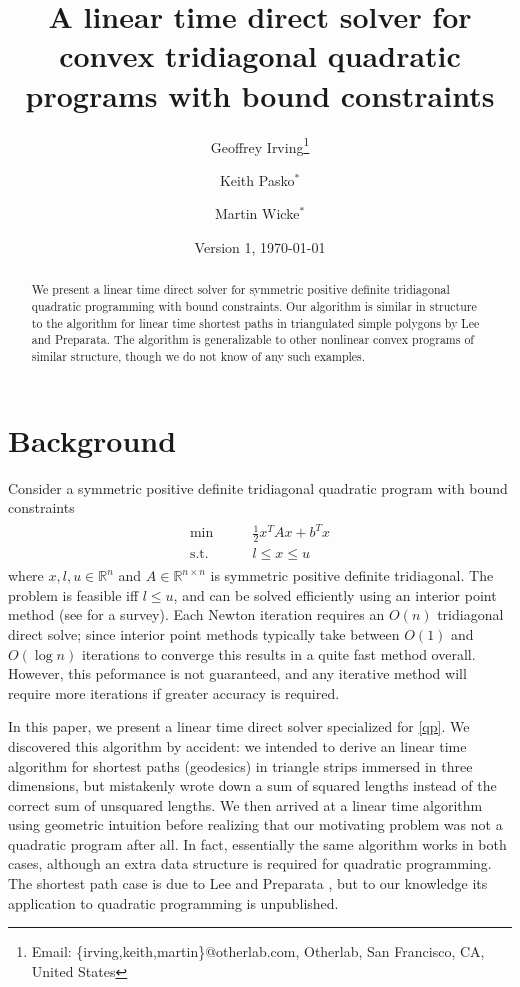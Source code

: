 \documentclass[11pt]{article}
\title{A linear time direct solver for convex tridiagonal quadratic programs with bound constraints}
\author{Geoffrey Irving\thanks{Email: \{irving,keith,martin\}@otherlab.com, Otherlab, San Francisco, CA, United States}
\and Keith Pasko$^*$
\and Martin Wicke$^*$}
\date{Version 1, \today}
\newcommand{\R}{\mathbb{R}}
\begin{document}
\maketitle

\begin{abstract}
We present a linear time direct solver for symmetric positive definite tridiagonal quadratic programming with bound constraints.  Our algorithm is similar in structure to the
algorithm for linear time shortest paths in triangulated simple polygons by Lee and Preparata.  The algorithm is generalizable to other nonlinear convex programs of similar
structure, though we do not know of any such examples.
\end{abstract}

\section{Background}

Consider a symmetric positive definite tridiagonal quadratic program with bound constraints
\begin{align} \label{qp}
\begin{array}{cc}
\min          \qquad& \frac{1}{2} x^T A x + b^T x \\
\textrm{s.t.} & l \le x \le u
\end{array}
\end{align}
where $x,l,u \in \R^n$ and $A \in \R^{n \times n}$ is symmetric positive definite tridiagonal.  The problem is feasible iff $l \le u$, and can be solved efficiently using an interior point method (see \cite{gondzio2012interior}
for a survey).  Each Newton iteration requires an $O(n)$ tridiagonal direct solve; since interior point methods typically take between $O(1)$ and $O(\log n)$ iterations to converge \cite{colombo2008further}
this results in a quite fast method overall.  However, this peformance is not guaranteed, and any iterative method will require more iterations if greater accuracy is required.

In this paper, we present a linear time direct solver specialized for \cref{qp}.  We discovered this algorithm by accident: we intended to derive an linear time algorithm
for shortest paths (geodesics) in triangle strips immersed in three dimensions, but mistakenly wrote down a sum of squared lengths instead of the correct sum of unsquared lengths.  We then arrived at a linear time algorithm
using geometric intuition before realizing that our motivating problem was not a quadratic program after all.  In fact, essentially the same algorithm works in both cases, although an extra data structure is required
for quadratic programming.  The shortest path case is due to Lee and Preparata \cite{lee1984euclidean}, but to our knowledge its application to quadratic programming is unpublished.
\end{document}
